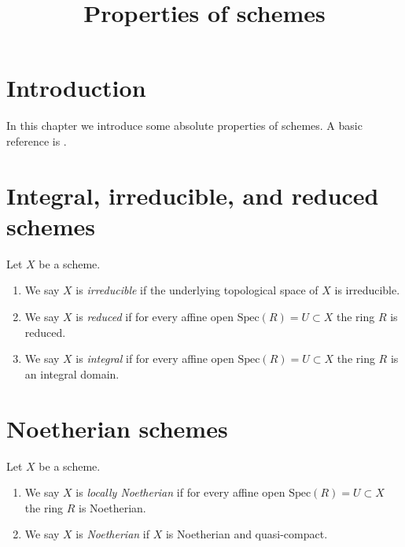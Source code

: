 

%


\title{Properties of schemes}


\maketitle

\tableofcontents

\section{Introduction}
\label{section-introduction}

\noindent
In this chapter we introduce some absolute properties of schemes.
A basic reference is \cite{EGA}.


\section{Integral, irreducible, and reduced schemes}
\label{section-integral}

\begin{definition}
\label{definition-integral}
Let $X$ be a scheme.
\begin{enumerate}
\item We say $X$ is {\it irreducible} if the underlying
topological space of $X$ is irreducible.
\item We say $X$ is {\it reduced} if for every affine open
$\text{Spec}(R) = U \subset X$ the ring $R$ is reduced.
\item We say $X$ is {\it integral} if for every affine open
$\text{Spec}(R) = U \subset X$ the ring $R$ is an integral domain.
\end{enumerate}
\end{definition}




\section{Noetherian schemes}
\label{section-noetherian}


\begin{definition}
\label{definition-noetherian}
Let $X$ be a scheme.
\begin{enumerate}
\item We say $X$ is {\it locally Noetherian} if for every affine open
$\text{Spec}(R) = U \subset X$ the ring $R$ is Noetherian.
\item We say $X$ is {\it Noetherian} if $X$ is Noetherian
and quasi-compact.
\end{enumerate}
\end{definition}



